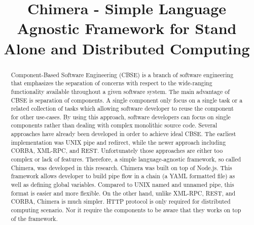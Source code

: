 \documentclass[conference]{IEEEtran}
\begin{document}

\title{Chimera - Simple Language Agnostic Framework for Stand Alone and Distributed Computing}

\author{
\and
{}
\and
{}
}

\maketitle


\begin{abstract}
Component-Based Software Engineering (CBSE) is a branch of software 
engineering that emphasizes the separation of concerns with respect to the 
wide-ranging functionality available throughout a given software system.  The 
main advantage of CBSE is separation of components. A single component  
only focus on a single task or a related collection of tasks which allowing software 
developer to reuse the component for other use-cases. By using this approach, 
software developers can focus on single components rather than dealing with complex 
monolithic source code. Several approaches have already been developed in order to 
achieve ideal CBSE. The earliest implementation was UNIX pipe and redirect, 
while the newer approach including CORBA, XML-RPC, and REST. 
Unfortunately those approaches are either too complex or lack of features.
Therefore, a simple language-agnostic framework, so called Chimera, was developed 
in this research. Chimera was built on top of Node.js. This framework allows developer 
to build pipe flow in a chain (a YAML formatted file) as well as defining global variables. 
Compared to UNIX named and unnamed pipe, this format is easier and more flexible. 
On the other hand, unlike XML-RPC, REST, and CORBA, Chimera is much simpler. 
HTTP protocol is only required for distributed computing scenario. Nor it require the 
components to be aware that they works on top of the framework.
\end{abstract}
\end{document}
